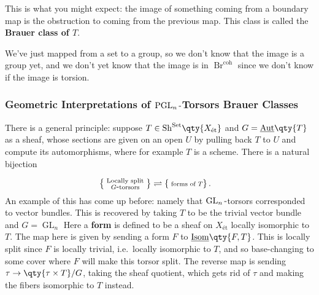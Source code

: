 \begin{remark}

This is what you might expect: the image of something coming from a
boundary map is the obstruction to coming from the previous map. This
class is called the \textbf{Brauer class of \(T\)}.

\end{remark}

We've just mapped from a set to a group, so we don't know that the image
is a group yet, and we don't yet know that the image is in
\(\operatorname{Br}^{\operatorname{coh}}\) since we don't know if the
image is torsion.

\hypertarget{geometric-interpretations-of-operatornamepgl_nhbox-torsors-brauer-classes}{%
\subsubsection{\texorpdfstring{Geometric Interpretations of
\(\operatorname{PGL}_{n}{\hbox{-}}\)Torsors Brauer
Classes}{Geometric Interpretations of \textbackslash operatorname\{PGL\}\_\{n\}\{\textbackslash hbox\{-\}\}Torsors Brauer Classes}}\label{geometric-interpretations-of-operatornamepgl_nhbox-torsors-brauer-classes}}

There is a general principle: suppose
\(T\in{\operatorname{Sh}}^{{\operatorname{Set}}}\qty{X_{\text{ét}}}\)
and \(G = \underline{{\operatorname{Aut}}}\qty{T}\) as a sheaf, whose
sections are given on an open \(U\) by pulling back \(T\) to \(U\) and
compute its automorphisms, where for example \(T\) is a scheme. There is
a natural bijection

\begin{align*}
\left\{{\substack{\text{ Locally split } \\ G{\hbox{-}}\text{torsors}}}\right\}
&\rightleftharpoons
\left\{{\substack{\text{ forms of  } T}}\right\}
.\end{align*}
An example of this has come up before: namely that
\(\operatorname{GL}_{n}{\hbox{-}}\)torsors corresponded to vector
bundles. This is recovered by taking \(T\) to be the trivial vector
bundle and \(G=\operatorname{GL}_{n}\) Here a \textbf{form} is defined
to be a sheaf on \(X_{\text{ét}}\) locally isomorphic to \(T\). The map
here is given by sending a form \(F\) to
\(\underline{\mathrm{Isom}}\qty{F, T}\). This is locally split since
\(F\) is locally trivial, i.e.~locally isomorphic to \(T\), and so
base-changing to some cover where \(F\) will make this torsor split. The
reverse map is sending \(\tau \to \qty{\tau\times T}/G\), taking the
sheaf quotient, which gets rid of \(\tau\) and making the fibers
isomorphic to \(T\) instead.

